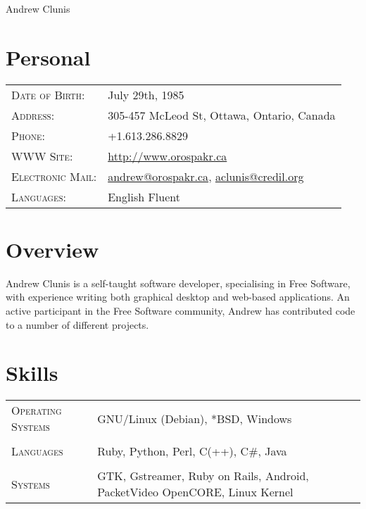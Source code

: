 \documentclass[letterpaper,10pt]{article}
\begin{document}
\pagestyle{empty} %

\par{\centering
{\Huge Andrew \textsc Clunis
}\bigskip\par}

\section{Personal}
\begin{longtable}{p{3cm}|p{12cm}}
  \textsc{Date of Birth:} & July 29th, 1985 \\
  \textsc{Address:} & 305-457 McLeod St, Ottawa, Ontario, Canada \\
  \textsc{Phone:} & +1.613.286.8829 \\
  \textsc{WWW Site:} & \href{http://www.orospakr.ca}{http://www.orospakr.ca} \\
  \textsc{Electronic Mail:} & \href{mailto:andrew@orospakr.ca}{andrew@orospakr.ca}, \href{mailto:aclunis@credil.org}{aclunis@credil.org} \\
  \textsc{Languages:} & English Fluent
\end{longtable}

\section{Overview}
Andrew Clunis is a self-taught software developer, specialising in Free Software, with experience writing both graphical desktop and web-based applications.  An active participant in the Free Software community, Andrew has contributed code to a number of different projects.

\section{Skills}
\begin{longtable}{p{3cm}|p{12cm}}
  \textsc{Operating Systems} & GNU/Linux (Debian), *BSD, Windows\\
  \multicolumn{2}{c}{} \\
  \textsc{Languages} & Ruby, Python, Perl, C(++), C\#, Java \\
  \multicolumn{2}{c}{} \\
  \textsc{Systems} & GTK, Gstreamer, Ruby on Rails, Android, PacketVideo OpenCORE, Linux Kernel
\end{longtable}
\end{document}

